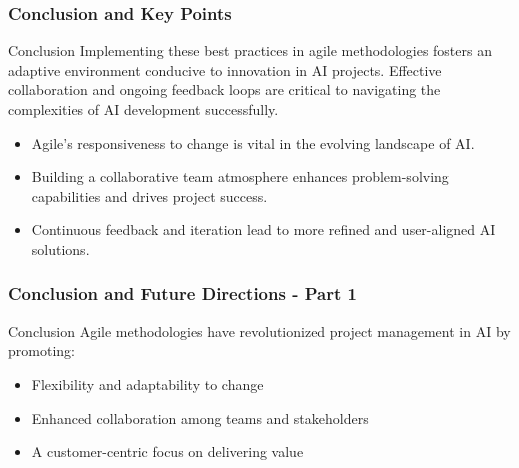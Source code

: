 \documentclass{beamer}
\begin{document}
\begin{frame}[fragile]
    \frametitle{Conclusion and Key Points}
    \begin{block}{Conclusion}
        Implementing these best practices in agile methodologies fosters an adaptive environment conducive to innovation in AI projects. Effective collaboration and ongoing feedback loops are critical to navigating the complexities of AI development successfully.
    \end{block}

    \begin{itemize}
        \item Agile's responsiveness to change is vital in the evolving landscape of AI.
        \item Building a collaborative team atmosphere enhances problem-solving capabilities and drives project success.
        \item Continuous feedback and iteration lead to more refined and user-aligned AI solutions.
    \end{itemize}
\end{frame}

\begin{frame}[fragile]
    \frametitle{Conclusion and Future Directions - Part 1}
    \begin{block}{Conclusion}
        Agile methodologies have revolutionized project management in AI by promoting:
    \end{block}
    \begin{itemize}
        \item Flexibility and adaptability to change
        \item Enhanced collaboration among teams and stakeholders
        \item A customer-centric focus on delivering value
    \end{itemize}
\end{frame}
\end{document}
